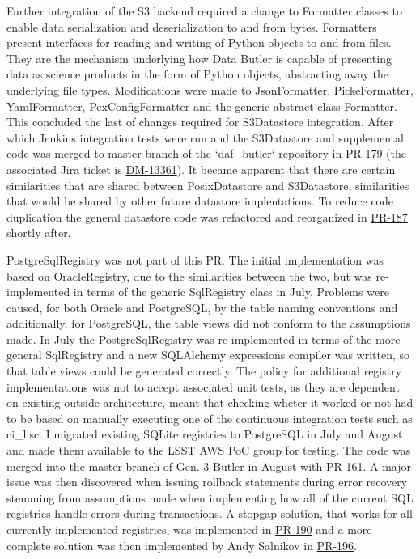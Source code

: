 Further integration of the S3 backend required a change to Formatter classes to enable data serialization and deserialization to and from bytes. Formatters present interfaces for reading and writing of Python objects to and from files. They are the mechanism underlying how Data Butler is capable of presenting data as science products in the form of Python objects, abstracting away the underlying file types. Modifications were made to JsonFormatter, PickeFormatter, YamlFormatter, PexConfigFormatter and the generic abstract class Formatter. This concluded the last of changes required for S3Datastore integration. After which Jenkins integration tests were run and the S3Datastore and supplemental code was merged to master branch of the `daf\_butler` repository in \href{https://github.com/lsst/daf_butler/pull/179}{PR-179} (the associated Jira ticket is \href{https://jira.lsstcorp.org/browse/DM-13361}{DM-13361}). It became apparent that there are certain similarities that are shared between PosixDatastore and S3Datastore, similarities that would be shared by other future datastore implentations. To reduce code duplication the general datastore code was refactored and reorganized in \href{https://github.com/lsst/daf_butler/pull/187}{PR-187} shortly after. 

PostgreSqlRegistry was not part of this PR. The initial implementation was based on OracleRegistry, due to the similarities between the two, but was re-implemented in terms of the generic SqlRegistry class in July. Problems were caused, for both Oracle and PostgreSQL, by the table naming conventions and additionally, for PostgreSQL, the table views did not conform to the assumptions made. In July the PostgreSqlRegistry was re-implemented in terms of the more general SqlRegistry and a new SQLAlchemy expressions compiler was written, so that table views could be generated correctly. The policy for additional registry implementations was not to accept associated unit tests, as they are dependent on existing outside architecture, meant that checking wheter it worked or not had to be based on manually executing one of the continuous integration tests such as ci\_hsc. I migrated existing SQLite registries to PostgreSQL in July and August and made them available to the LSST AWS PoC group for testing. The code was merged into the master branch of Gen. 3 Butler in August with \href{https://github.com/lsst/daf_butler/pull/161}{PR-161}. A major issue was then discovered when issuing rollback statements during error recovery stemming from assumptions made when implementing how all of the current SQL registries handle errors during transactions. A stopgap solution, that works for all currently implemented registries, was implemented in \href{https://github.com/lsst/daf_butler/pull/190}{PR-190} and a more complete solution was then implemented by Andy Salnikov in \href{https://github.com/lsst/daf_butler/pull/196}{PR-196}.


